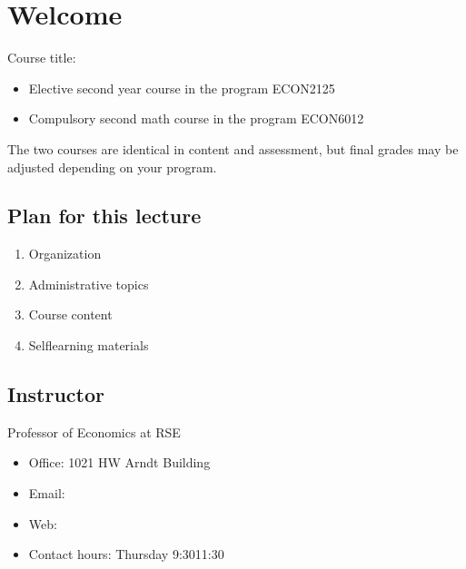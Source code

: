 \documentclass[letterpaper,10pt,english]{jupyterBook}
\begin{document}
\sphinxstepscope


\chapter{Welcome}
\label{\detokenize{01.introduction:welcome}}\label{\detokenize{01.introduction::doc}}
\sphinxAtStartPar
Course title: 
\begin{itemize}
\item {} 
\sphinxAtStartPar
Elective second year course in the  program ECON2125

\item {} 
\sphinxAtStartPar
Compulsory second math course in the  program ECON6012

\end{itemize}

\sphinxAtStartPar
The two courses are identical in content and assessment, but final grades may be adjusted depending on your program.


\section{Plan for this lecture}
\label{\detokenize{01.introduction:plan-for-this-lecture}}\begin{enumerate}
%
\item {} 
\sphinxAtStartPar
Organization

\item {} 
\sphinxAtStartPar
Administrative topics

\item {} 
\sphinxAtStartPar
Course content

\item {} 
\sphinxAtStartPar
Self\sphinxhyphen{}learning materials

\end{enumerate}


\section{Instructor}
\label{\detokenize{01.introduction:instructor}}
\sphinxAtStartPar
{}
Professor of Economics at RSE
\begin{itemize}
\item {} 
\sphinxAtStartPar
Office: 1021 HW Arndt Building

\item {} 
\sphinxAtStartPar
Email: 

\item {} 
\sphinxAtStartPar
Web: 

\item {} 
\sphinxAtStartPar
Contact hours: Thursday 9:30\sphinxhyphen{}11:30

\end{itemize}
\end{document}
